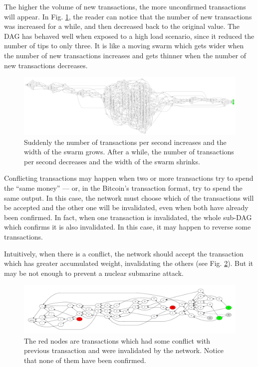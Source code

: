The higher the volume of new transactions, the more unconfirmed transactions will appear. In Fig. \ref{fig-tangle-swarm}, the reader can notice that the number of new transactions was increased for a while, and then decreased back to the original value. The DAG has behaved well when exposed to a high load scenario, since it reduced the number of tips to only three. It is like a moving swarm which gets wider when the number of new transactions increases and gets thinner when the number of new transactions decreases.

\begin{figure}[ht]
\centering\includegraphics[width=\textwidth]{./images01/fig-tangle-swarm.pdf}
\caption{Suddenly the number of transactions per second increases and the width of the swarm grows. After a while, the number of transactions per second decreases and the width of the swarm shrinks.\label{fig-tangle-swarm}}
\end{figure}

Conflicting transactions may happen when two or more transactions try to spend the ``same money'' --- or, in the Bitcoin's transaction format, try to spend the same output. In this case, the network must choose which of the transactions will be accepted and the other one will be invalidated, even when both have already been confirmed. In fact, when one transaction is invalidated, the whole sub-DAG which confirms it is also invalidated. In this case, it may happen to reverse some transactions.

Intuitively, when there is a conflict, the network should accept the transaction which has greater accumulated weight, invalidating the others (see Fig. \ref{fig-tangle-conflict}). But it may be not enough to prevent a nuclear submarine attack.

\begin{figure}[ht]
\centering\includegraphics[width=\textwidth]{./images01/fig-tangle-conflict.pdf}
\caption{The red nodes are transactions which had some conflict with previous transaction and were invalidated by the network. Notice that none of them have been confirmed.\label{fig-tangle-conflict}}
\end{figure}

